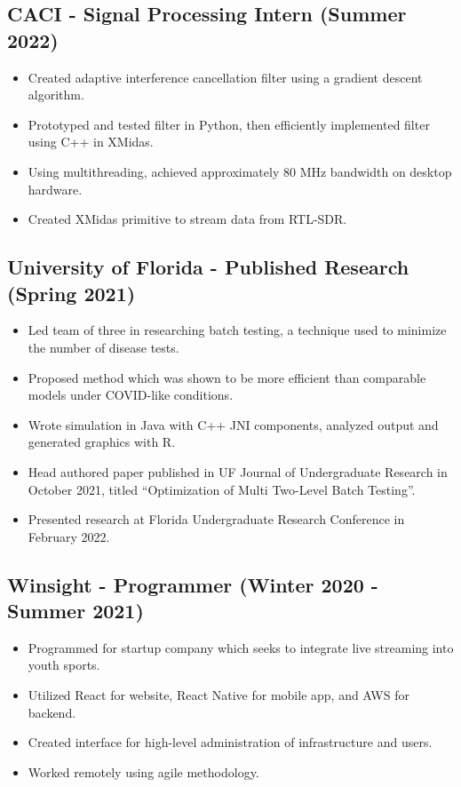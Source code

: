 \documentclass{article}
\newenvironment{CustomItemize}
{ \begin{itemize}[leftmargin=1em]
    \setlength{\itemsep}{0pt}
    \setlength{\parskip}{0pt}
    \setlength{\parindent}{0pt}
    \setlength{\parsep}{0pt}     }
{ \end{itemize}                  }
\begin{document}
\subsection{CACI - Signal Processing Intern (Summer 2022)}
\begin{CustomItemize}
\item Created adaptive interference cancellation filter using a gradient descent algorithm.
\item Prototyped and tested filter in Python, then efficiently implemented filter using C++ in XMidas.
\item Using multithreading, achieved approximately 80 MHz bandwidth on desktop hardware.
\item Created XMidas primitive to stream data from RTL-SDR.
\end{CustomItemize}

\subsection{University of Florida - Published Research (Spring 2021)}
\begin{CustomItemize}
\item Led team of three in researching batch testing, a technique used to minimize the number of disease tests.
\item Proposed method which was shown to be more efficient than comparable models under COVID-like conditions.
\item Wrote simulation in Java with C++ JNI components, analyzed output and generated graphics with R.
\item Head authored paper published in UF Journal of Undergraduate Research in October 2021, titled ``Optimization of Multi Two-Level Batch Testing''.
\item Presented research at Florida Undergraduate Research Conference in February 2022.
\end{CustomItemize}

\subsection{Winsight - Programmer (Winter 2020 - Summer 2021)}
\begin{CustomItemize}
\item Programmed for startup company which seeks to integrate live streaming into youth sports.
\item Utilized React for website, React Native for mobile app, and AWS for backend.
\item Created interface for high-level administration of infrastructure and users.
\item Worked remotely using agile methodology.
\end{CustomItemize}
\end{document}
